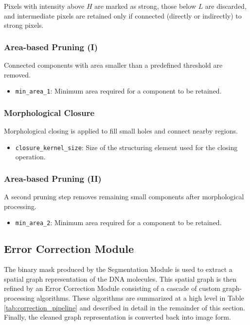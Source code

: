 \documentclass[english,12pt,a4paper]{article}
\begin{document}
	Pixels with intensity above $H$ are marked as strong, those below $L$ are discarded, and intermediate pixels are retained only if connected (directly or indirectly) to strong pixels.
	
	\subsubsection{Area-based Pruning (I)}
	
	Connected components with area smaller than a predefined threshold are removed.
	
	\begin{itemize}
		\item \texttt{min\_area\_1}: Minimum area required for a component to be retained.
	\end{itemize}
	
	\subsubsection{Morphological Closure}
	
	Morphological closing is applied to fill small holes and connect nearby regions.
	
	\begin{itemize}
		\item \texttt{closure\_kernel\_size}: Size of the structuring element used for the closing operation.
	\end{itemize}
	
	\subsubsection{Area-based Pruning (II)}
	
	A second pruning step removes remaining small components after morphological processing.
	
	\begin{itemize}
		\item \texttt{min\_area\_2}: Minimum area required for a component to be retained.
	\end{itemize}
	
	\newpage
	
	\subsection{Error Correction Module}
	
	The binary mask produced by the Segmentation Module is used to extract a spatial graph representation of the DNA molecules. This spatial graph is then refined by an Error Correction Module consisting of a cascade of custom graph-processing algorithms. These algorithms are summarized at a high level in Table \ref{tab:correction_pipeline} and described in detail in the remainder of this section. Finally, the cleaned graph representation is converted back into image form.
	
\end{document}
